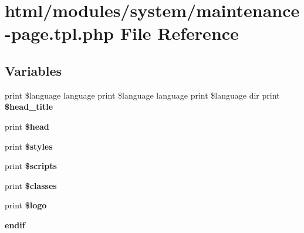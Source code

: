 \hypertarget{modules_2system_2maintenance-page_8tpl_8php}{
\section{html/modules/system/maintenance-\/page.tpl.php File Reference}
\label{modules_2system_2maintenance-page_8tpl_8php}
}
\subsection*{Variables}
\begin{DoxyCompactItemize}
\item 
\hypertarget{modules_2system_2maintenance-page_8tpl_8php_ad510a9cc62fd9abe528a5bd3f04c66f0}{
print \$language language print \$language language print \$language dir print {\bfseries \$head\_\-title}}
\label{modules_2system_2maintenance-page_8tpl_8php_ad510a9cc62fd9abe528a5bd3f04c66f0}

\item 
\hypertarget{modules_2system_2maintenance-page_8tpl_8php_a2758cd2886f39b56c05b61ab6cec7a5d}{
print {\bfseries \$head}}
\label{modules_2system_2maintenance-page_8tpl_8php_a2758cd2886f39b56c05b61ab6cec7a5d}

\item 
\hypertarget{modules_2system_2maintenance-page_8tpl_8php_a8f1db0526d0e6b99ae580d83209e717f}{
print {\bfseries \$styles}}
\label{modules_2system_2maintenance-page_8tpl_8php_a8f1db0526d0e6b99ae580d83209e717f}

\item 
\hypertarget{modules_2system_2maintenance-page_8tpl_8php_a2163fdf9fe7af884a6291084c2811896}{
print {\bfseries \$scripts}}
\label{modules_2system_2maintenance-page_8tpl_8php_a2163fdf9fe7af884a6291084c2811896}

\item 
\hypertarget{modules_2system_2maintenance-page_8tpl_8php_a6d48ecbdbc70ca1812e665169b5fa1e2}{
print {\bfseries \$classes}}
\label{modules_2system_2maintenance-page_8tpl_8php_a6d48ecbdbc70ca1812e665169b5fa1e2}

\item 
\hypertarget{modules_2system_2maintenance-page_8tpl_8php_a0fa695c12e5240657bb07a7742cf8391}{
print {\bfseries \$logo}}
\label{modules_2system_2maintenance-page_8tpl_8php_a0fa695c12e5240657bb07a7742cf8391}

\item 
\hypertarget{modules_2system_2maintenance-page_8tpl_8php_a9ecbffef21ad2507edfcf60b871713c6}{
{\bfseries endif}}
\label{modules_2system_2maintenance-page_8tpl_8php_a9ecbffef21ad2507edfcf60b871713c6}


\end{DoxyCompactItemize}
